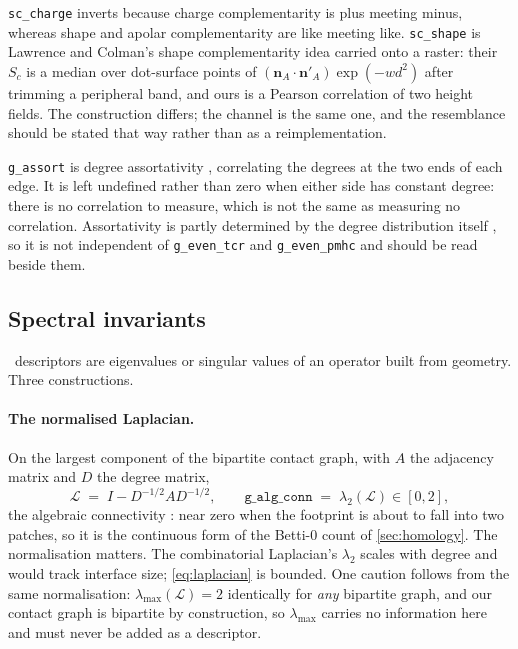 \documentclass[11pt,a4paper]{article}
\newcommand{\dsc}[1]{\texttt{#1}}
\begin{document}
\dsc{sc\_charge} inverts because charge complementarity is plus meeting minus, whereas shape and
apolar complementarity are like meeting like. \dsc{sc\_shape} is Lawrence and Colman's shape
complementarity idea \cite{LawrenceColman1993} carried onto a raster: their $S_c$ is a median over
dot-surface points of $(\mathbf{n}_A \!\cdot\! \mathbf{n}'_A)\exp(-w d^2)$ after trimming a
peripheral band, and ours is a Pearson correlation of two height fields. The construction differs;
the channel is the same one, and the resemblance should be stated that way rather than as a
reimplementation.

\dsc{g\_assort} is degree assortativity \cite{Newman2002}, correlating the degrees at the two ends
of each edge. It is left undefined rather than zero when either side has constant degree: there is
no correlation to measure, which is not the same as measuring no correlation. Assortativity is
partly determined by the degree distribution itself \cite{BaglerSinha2007}, so it is not independent
of \dsc{g\_even\_tcr} and \dsc{g\_even\_pmhc} and should be read beside them.

\subsection{Spectral invariants}

\nOpSpectral\ descriptors are eigenvalues or singular values of an operator built from geometry.
Three constructions.

\paragraph{The normalised Laplacian.} On the largest component of the bipartite contact graph, with
$A$ the adjacency matrix and $D$ the degree matrix,
%
\begin{equation}
\mathcal{L} \;=\; I - D^{-1/2} A D^{-1/2}, \qquad
\dsc{g\_alg\_conn} \;=\; \lambda_2(\mathcal{L}) \in [0,2],
\label{eq:laplacian}
\end{equation}
%
the algebraic connectivity \cite{Fiedler1973}: near zero when the footprint is about to fall into
two patches, so it is the continuous form of the Betti-0 count of \cref{sec:homology}. The
normalisation matters. The combinatorial Laplacian's $\lambda_2$ scales with degree and would track
interface size; \cref{eq:laplacian} is bounded. One caution follows from the same normalisation:
$\lambda_{\max}(\mathcal{L}) = 2$ identically for \emph{any} bipartite graph, and our contact graph
is bipartite by construction, so $\lambda_{\max}$ carries no information here and must never be
added as a descriptor.
\end{document}
